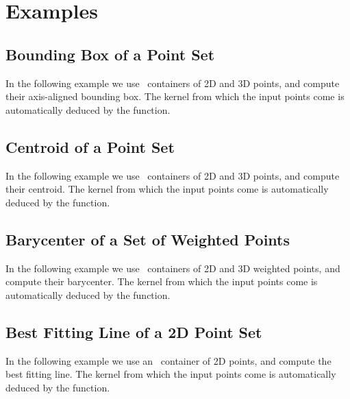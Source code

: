 

\minitoc




\section{Examples\label{subsec:pca_examples}}

\subsection{Bounding Box of a Point Set}

In the following example we use \stl\ containers of 2D and 3D points, and
compute their axis-aligned bounding box. The kernel from which the input points
come is automatically deduced by the function.


\subsection{Centroid of a Point Set}

In the following example we use \stl\ containers of 2D and 3D points, and
compute their centroid. The kernel from which the input points
come is automatically deduced by the function.


\subsection{Barycenter of a Set of Weighted Points}

In the following example we use \stl\ containers of 2D and 3D weighted points,
and compute their barycenter. The kernel from which the input points come is
automatically deduced by the function.


\subsection{Best Fitting Line of a 2D Point Set}

In the following example we use an \stl\ container of 2D points, and
compute the best fitting line. The kernel from which the input points
come is automatically deduced by the function.


